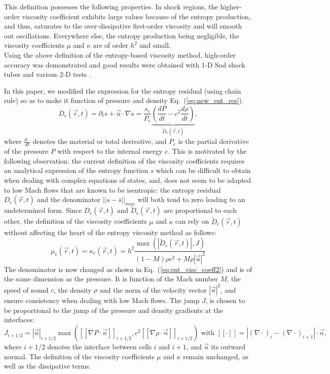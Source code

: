 \documentclass[12pt]{article}
\newcommand{\eqt}[1]{Eq.~(\ref{#1})} %
\begin{document}
This definition possesses the following properties.
In shock regions, the higher-order viscosity coefficient exhibits large values because of the entropy production, and thus, saturates to the over-dissipative first-order viscosity and will smooth out oscillations. Everywhere else, the entropy production being negligible, the viscosity coefficients $\mu$ and $\kappa$ are of order $h^2$ and small.\\
Using the above definition of the entropy-based viscosity method, high-order accuracy was demonstrated and good results were obtained with 1-D Sod shock tubes and various 2-D tests \cite{valentin, jlg1, jlg2}.

In this paper, we modified the expression for the entropy residual (using chain rule) so as to make it function of pressure and  density \eqt{eq:new_ent_res}. 
\begin{equation}
\label{eq:new_ent_res}
D_e(\vec{r},t) = \partial_t s + \vec{u} \cdot \nabla s = \frac{s_e}{P_e} \underbrace{\left( \frac{d P}{dt} - c^2 \frac{d \rho}{dt} \right)}_{\tilde{D}_e(\vec{r},t)},
\end{equation}
where $\frac{d \cdot}{dt}$ denotes the material or total derivative, and $P_e$ is the partial derivative of the pressure $P$ with respect to the internal energy $e$. 
This is motivated by the following observation: the current definition of the viscosity coefficients requires an analytical expression of the entropy function $s$ which can be difficult to obtain when dealing with complex equations of states, and, does not seem to be adapted to low Mach flows that are known to be isentropic: the entropy residual $D_e(\vec{r},t)$ and the denominator $|| s - \bar{s} ||_{max}$ will both tend to zero leading to an undetermined form. Since $D_e(\vec{r},t)$ and $\tilde{D}_e(\vec{r},t)$ are proportional to each other, the definition of the viscosity coefficients $\mu$ and $\kappa$ can rely on $\tilde{D}_e(\vec{r},t)$ without affecting the heart of the entropy viscosity method as follows: 
\begin{equation}
\label{eq:ent_visc_coeff2}
\mu_e(\vec{r},t) = \kappa_e(\vec{r},t) = h^2 \frac{\max\left( | \tilde{D}_e(\vec{r},t) |, J \right)}{(1-M) \rho c^2 + M \rho |\vec{u}|^2}
\end{equation}
The denominator is now changed as shown in \eqt{eq:ent_visc_coeff2} and is of the same dimension as the pressure. It is function of the Mach number $M$, the speed of sound $c$, the density $\rho$ and the norm of the velocity vector $|\vec{u}|^2$, and ensure consistency when dealing with low Mach flows. The jump $J$,  is chosen to be proportional to the jump of the pressure and density gradients at the interfaces:
\begin{equation}
\label{eq:equation23}
J_{i+1/2} = |\vec{u}|_{i+1/2} \max \left( [[ \nabla P \cdot \vec{n} ]]_{i+1/2}, c^2 [[ \nabla \rho \cdot \vec{n} ]]_{i+1/2} \right) \text{ with } [[ \cdot ]] = |(\nabla \cdot)_i -  (\nabla \cdot)_{i+1}| \cdot \vec{n},
\end{equation}
where $i+1/2$ denotes the interface between cells $i$ and $i+1$, and $\vec{n}$ its outward normal.
The definition of the viscosity coefficients $\mu$ and $\kappa$ remain unchanged, as well as the dissipative terms.
\end{document}
